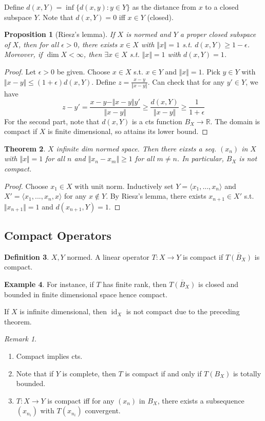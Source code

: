 \documentclass{article}
\theoremstyle{definition}
\newtheorem{defn}{Definition}[section]
\newtheorem{example}[defn]{Example}
\theoremstyle{remark}
\newtheorem{rem}{Remark}
\theoremstyle{plain}
\newtheorem{thm}[defn]{Theorem}
\newtheorem{prop}[defn]{Proposition}
\newcommand{\RR}{\mathbb{R}}
\begin{document}
Define $d(x,Y)=\inf\{d(x,y):y\in Y\}$ as the distance from $x$ to a closed subspace $Y$. Note that $d(x,Y)=0$ iff $x\in Y$ (closed).
\begin{prop}[Riesz's lemma]
    If $X$ is normed and $Y$ a proper closed subspace of $X$, then for all $\epsilon>0$, there exists $x\in X$ with $\Vert x\Vert=1$ s.t. $d(x,Y)\ge 1-\epsilon$. Moreover, if $\dim X<\infty$, then $\exists x\in X$ s.t. $\Vert x\Vert =1$ with $d(x,Y)=1$.
\end{prop}
\begin{proof}
    Let $\epsilon>0$ be given.
    Choose $x\in X$ s.t. $x\in Y$ and $\Vert x\Vert=1$. Pick $y\in Y$ with $\Vert x-y\Vert\le (1+\epsilon)d(x,Y)$. Define $z=\frac{x-y}{\Vert x-y\Vert}$. Can check that for any $y'\in Y$, we have
    \[z-y'=\dfrac{x-y-\Vert x-y\Vert y'}{\Vert x-y\Vert}\ge \dfrac{d(x,Y)}{\Vert x-y\Vert}\ge \dfrac{1}{1+\epsilon}\]
    For the second part, note that $d(x,Y)$ is a cts function $B_X\to\RR$. The domain is compact if $X$ is finite dimensional, so attains its lower bound.
\end{proof}
\begin{thm}
    $X$ infinite dim normed space. Then there eixsts a seq. $(x_n)$ in $X$ with $\Vert x\Vert=1$ for all $n$ and $\Vert x_n-x_m\Vert\ge 1$ for all $m\neq n$. In particular, $B_X$ is not compact.
\end{thm}
\begin{proof}
    Choose $x_1\in X$ with unit norm. Inductively set $Y=\langle x_1,...,x_n\rangle$ and $X'=\langle x_1,...,x_n,x\rangle$ for any $x\not\in Y$. By Riesz's lemma, there exists $x_{n+1}\in X'$ s.t. $\Vert x_{n+1}\Vert=1$ and $d(x_{n+1},Y)=1$.
\end{proof}

\subsection{Compact Operators}
\begin{defn}
    $X,Y$ normed. A linear operator $T:X\to Y$ is compact if $\overline{T(B_X)}$ is compact.
\end{defn}


\begin{example}
    For instance, if $T$ has finite rank, then $\overline{T(B_X)}$ is closed and bounded in finite dimensional space hence compact.

    If $X$ is infinite dimensional, then $\operatorname{id}_X$ is not compact due to the preceding theorem.
\end{example}
\begin{rem}
    \begin{enumerate}
        \item Compact implies cts.
        \item Note that if $Y$ is complete, then $T$ is compact if and only if $T(B_X)$ is totally bounded. 
        \item $T:X\to Y$ is compact iff for any $(x_n)$ in $B_X$, there exists a subsequence $(x_{n_i})$ with $T(x_{n_i})$ convergent.
    \end{enumerate}
\end{rem}
\end{document}
